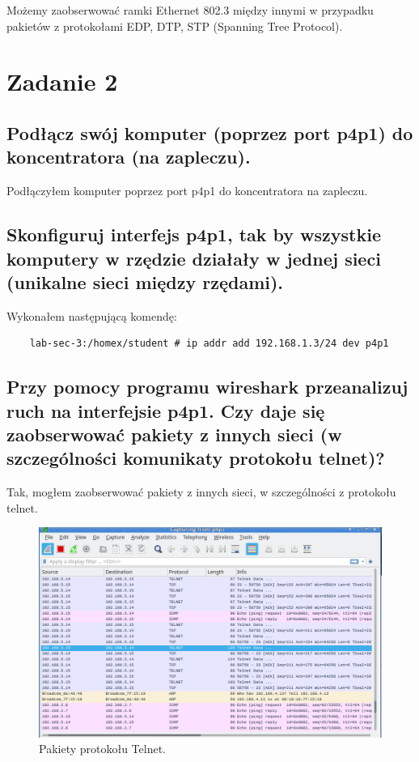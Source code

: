 \documentclass[polish, a4paper]{article}
\begin{document}
Możemy zaobserwować ramki Ethernet 802.3 między innymi w przypadku pakietów z protokołami EDP, DTP, STP (Spanning Tree Protocol).

\section{Zadanie 2}
\subsection{Podłącz swój komputer (poprzez port p4p1) do koncentratora
(na zapleczu).}

Podłączyłem komputer poprzez port p4p1 do koncentratora na zapleczu.


\subsection{Skonfiguruj interfejs p4p1, tak by wszystkie komputery w
rzędzie działały w jednej sieci (unikalne sieci między rzędami).}

Wykonałem następującą komendę:
\begin{verbatim}
    lab-sec-3:/homex/student # ip addr add 192.168.1.3/24 dev p4p1
\end{verbatim}

\subsection{Przy pomocy programu wireshark przeanalizuj ruch na
interfejsie p4p1. Czy daje się zaobserwować pakiety z innych
sieci (w szczególności komunikaty protokołu telnet)?}

Tak, mogłem zaobserwować pakiety z innych sieci, w szczególności z protokołu telnet.

\begin{figure}[H]
\centering
\includegraphics[width=\textwidth]{telnetidk.png}
\caption{Pakiety protokołu Telnet.}
\end{figure}
\end{document}
